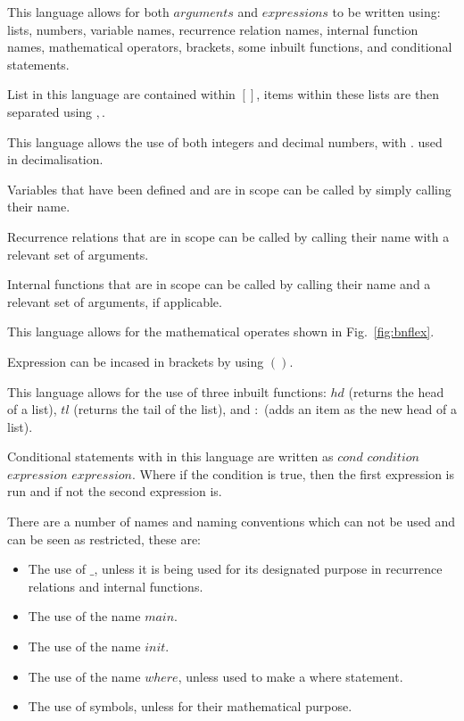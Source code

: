 \documentclass{article}
\begin{document}
This language allows for both $arguments$ and $expressions$ to be written using: lists, numbers, variable names, recurrence relation names, internal function names, mathematical operators, brackets, some inbuilt functions, and conditional statements. 

List in this language are contained within $[]$, items within these lists are then separated using $,$.  

This language allows the use of both integers and decimal numbers, with $.$ used in decimalisation. 

Variables that have been defined and are in scope can be called by simply calling their name. 

Recurrence relations that are in scope can be called by calling their name with a relevant set of arguments.  

Internal functions that are in scope can be called by calling their name and a relevant set of arguments, if applicable. 

This language allows for the mathematical operates shown in Fig.~\ref{fig:bnflex}.

Expression can be incased in brackets by using $()$.

This language allows for the use of three inbuilt functions: $hd$ (returns the head of a list), $tl$ (returns the tail of the list), and $:$ (adds an item as the new head of a list).  

Conditional statements with in this language are written as $cond$ $condition$ $expression$ $expression$. Where if the condition is true, then the first expression is run and if not the second expression is.  

There are a number of names and naming conventions which can not be used and can be seen as restricted, these are:
\begin{itemize}
  \item The use of $\_$, unless it is being used for its designated purpose in recurrence relations and internal functions. 
  \item The use of the name $main$.
  \item The use of the name $init$.
  \item The use of the name $where$, unless used to make a where statement.
  \item The use of symbols, unless for their mathematical purpose.  
\end{itemize}
\end{document}
